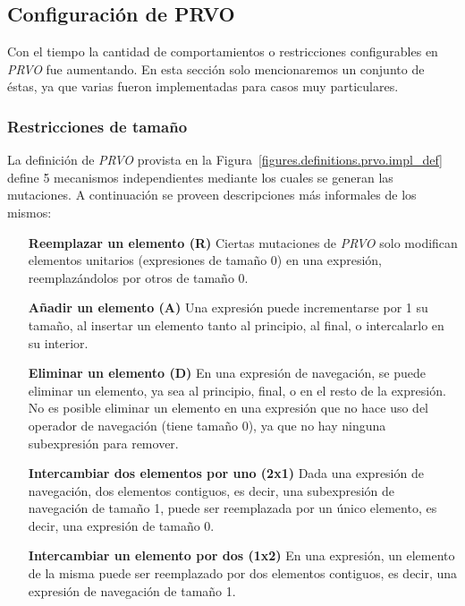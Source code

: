 \subsection{Configuraci\'on de PRVO}

Con el tiempo la cantidad de comportamientos o restricciones configurables en \emph{PRVO} fue aumentando. En esta secci\'on solo mencionaremos un conjunto de \'estas, ya que varias fueron implementadas para casos muy particulares.

\subsubsection{Restricciones de tama\~no}
\label{sec:implementation.prvo.restrictions.size}

La definici\'on de \emph{PRVO} provista en la Figura~\ref{figures.definitions.prvo.impl_def} define 5 mecanismos independientes mediante los cuales se generan las mutaciones. A continuaci\'on se proveen descripciones m\'as informales de los mismos:

\begin{enumerate}[leftmargin=.75cm,align=left]
	\item[\textbf{Reemplazar un elemento (R)}] Ciertas mutaciones de \emph{PRVO} solo modifican elementos unitarios (expresiones de tama\~no 0) en una expresi\'on, reemplaz\'andolos por otros de tama\~no 0.
	
	\item[\textbf{A\~nadir un elemento (A)}] Una expresi\'on puede incrementarse por 1 su tama\~no, al insertar un elemento tanto al principio, al final, o intercalarlo en su interior.
	
	\item[\textbf{Eliminar un elemento (D)}] En una expresi\'on de navegaci\'on, se puede eliminar un elemento, ya sea al principio, final, o en el resto de la expresi\'on. No es posible eliminar un elemento en una expresi\'on que no hace uso del operador de navegaci\'on (tiene tama\~no 0), ya que no hay ninguna subexpresi\'on para remover.
	
	\item[\textbf{Intercambiar dos elementos por uno (2x1)}] Dada una expresi\'on de navegaci\'on, dos elementos contiguos, es decir, una subexpresi\'on de navegaci\'on de tama\~no 1, puede ser reemplazada por un \'unico elemento, es decir, una expresi\'on de tama\~no 0.
	
	\item[\textbf{Intercambiar un elemento por dos (1x2)}] En una expresi\'on, un elemento de la misma puede ser reemplazado por dos elementos contiguos, es decir, una expresi\'on de navegaci\'on de tama\~no 1.
\end{enumerate}

